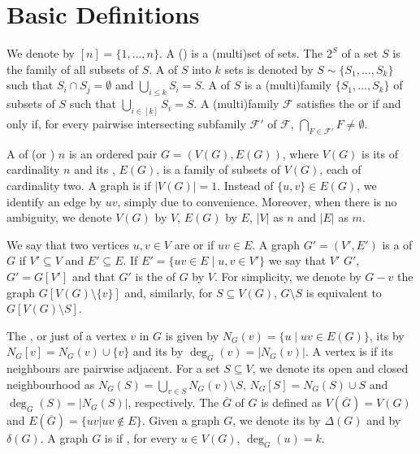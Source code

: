 \section{Basic Definitions}
\label{sec:basic_defs}

We denote by $[n] = \{1, \dots, n\}$.
A () is a (multi)set of sets.
The  $2^S$ of a set $S$ is the family of all subsets of $S$.
A  of $S$ into $k$ sets is denoted by $S \sim \{S_1, \dots, S_k\}$ such that $S_i \cap S_j = \emptyset$ and $\bigcup_{i \leq k} S_i = S$.
A  of $S$ is a (multi)family $\{S_1, \dots, S_k\}$ of subsets of $S$ such that $\bigcup_{i \in [k]} S_i = S$.
A (multi)family $\mathcal{F}$ satisfies the  or  if and only if, for every pairwise intersecting subfamily $\mathcal{F}'$ of $\mathcal{F}$, $\bigcap_{F \in \mathcal{F}'} F \neq \emptyset$.

A  of  (or ) $n$ is an ordered pair $G = (V(G), E(G))$, where $V(G)$ is its  of cardinality $n$ and its , $E(G)$, is a family of subsets of $V(G)$, each of cardinality two. A graph is  if $|V(G)| = 1$.
Instead of $\{u,v\} \in E(G)$, we identify an edge by $uv$, simply due to convenience. Moreover, when there is no ambiguity, we denote $V(G)$ by $V$, $E(G)$ by $E$, $|V|$ as $n$ and $|E|$ as $m$.

We say that two vertices $u,v \in V$ are  or  if $uv \in E$.
A graph $G' = (V', E')$ is a  of $G$ if $V' \subseteq V$ and $E' \subseteq E$.
If $E' = \{uv \in E \mid u,v \in V'\}$ we say that $V'$  $G'$, $G' = G[V']$ and that $G'$ is the  of $G$ by $V$.
For simplicity, we denote by $G - v$ the graph $G[V(G) \setminus \{v\}]$ and, similarly, for $S \subseteq V(G)$, $G \setminus S$ is equivalent to $G[V(G) \setminus S]$.

The , or just  of a vertex $v$ in $G$ is given by $N_G(v) = \{u \mid uv \in E(G)\}$, its  by $N_G[v] = N_G(v) \cup \{v\}$ and its  by $\deg_G(v) = |N_G(v)|$.
A vertex is  if its neighbours are pairwise adjacent.
For a set $S \subseteq V$, we denote its open and closed neighbourhood as $N_G(S) = \bigcup_{v \in S} N_G(v) \setminus S$, $N_G[S] = N_G(S) \cup S$ and $\deg_G(S) = |N_G(S)|$, respectively.
The  $\overline{G}$ of $G$ is defined as $V(\overline{G}) = V(G)$ and $E(\overline{G}) = \{uv | uv \notin E\}$.
Given a graph $G$, we denote its  by $\Delta(G)$ and  by $\delta(G)$.
A graph $G$ is  if , for every $u \in V(G)$, $\deg_G(u) = k$.


